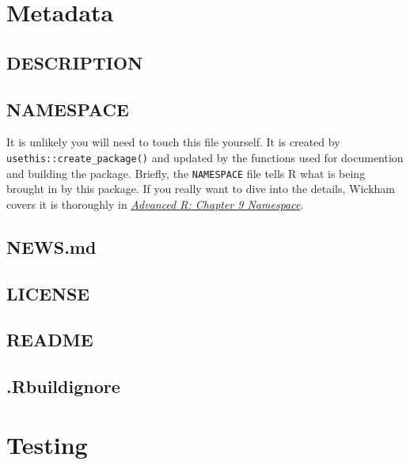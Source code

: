\documentclass[]{book}
\begin{document}
\hypertarget{metadata}{%
\section{Metadata}\label{metadata}}

\hypertarget{description}{%
\subsection{DESCRIPTION}\label{description}}

\hypertarget{namespace}{%
\subsection{NAMESPACE}\label{namespace}}

It is unlikely you will need to touch this file yourself. It is created by \texttt{usethis::create\_package()} and updated by the functions used for documention and building the package. Briefly, the \texttt{NAMESPACE} file tells R what is being brought in by this package. If you really want to dive into the details, Wickham covers it is thoroughly in \href{https://r-pkgs.org/namespace.html}{\emph{Advanced R: Chapter 9 Namespace}}.

\hypertarget{news.md}{%
\subsection{NEWS.md}\label{news.md}}

\hypertarget{license-1}{%
\subsection{LICENSE}\label{license-1}}

\hypertarget{readme}{%
\subsection{README}\label{readme}}

\hypertarget{rbuildignore}{%
\subsection{.Rbuildignore}\label{rbuildignore}}

\hypertarget{testing}{%
\section{Testing}\label{testing}}
\end{document}
